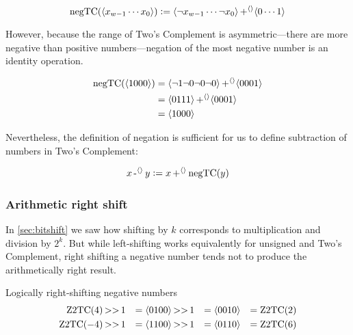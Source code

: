 \begin{definition}
  \[
    \mathrm{negTC}(\langle x_{w-1}\cdots{}x_{0} \rangle) \vcentcolon= \langle \neg{}x_{w-1}\cdots{}\neg{}x_{0} \rangle \operatorname{+^{\langle\rangle}} \langle 0\cdots{}1 \rangle
  \]
\end{definition}

However, because the range of Two's Complement is asymmetric---there
are more negative than positive numbers---negation of the most
negative number is an identity operation.

\begin{example}
  \begin{align}
    \mathrm{negTC}(\langle 1000 \rangle)
    &= \langle \neg 1 \neg 0 \neg 0 \neg 0 \rangle \operatorname{+^{\langle\rangle}} \langle 0001 \rangle \\
    &= \langle 0 1 1 1 \rangle \operatorname{+^{\langle\rangle}} \langle 0001 \rangle \\
    &= \langle 1 0 0 0 \rangle \\
  \end{align}
\end{example}

Nevertheless, the definition of negation is sufficient for us to
define subtraction of numbers in Two's Complement:

\begin{definition}
  \begin{align*}
    x \operatorname{-^{\langle\rangle}} y \vcentcolon= x \operatorname{+^{\langle\rangle}} \mathrm{negTC}(y)
  \end{align*}
  \label{def:intsub}
\end{definition}

\subsubsection{Arithmetic right shift}

In \cref{sec:bitshift} we saw how shifting by $k$ corresponds to
multiplication and division by $2^{k}$.  But while left-shifting works
equivalently for unsigned and Two's Complement, right shifting a
negative number tends not to produce the arithmetically right result.

\begin{example}{Logically right-shifting negative numbers}
  \begin{align}
    \mathrm{Z2TC}(4) \operatorname{>>} 1 &&= \langle 0100 \rangle \operatorname{>>} 1 &&= \langle 0010 \rangle &&= \mathrm{Z2TC}(2) \\
    \mathrm{Z2TC}(-4) \operatorname{>>} 1 &&= \langle 1100 \rangle \operatorname{>>} 1 &&= \langle 0110 \rangle &&= \mathrm{Z2TC}(6)
  \end{align}
\end{example}

